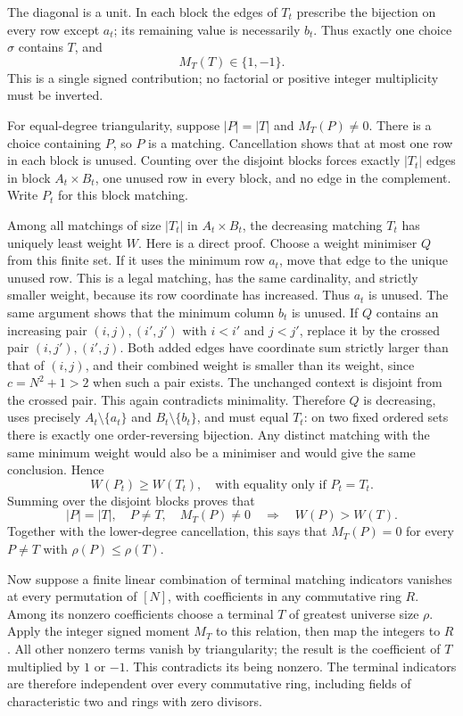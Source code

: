 The diagonal is a unit.  In each block the edges of $T_t$ prescribe the
bijection on every row except $a_t$; its remaining value is necessarily
$b_t$.  Thus exactly one choice $\sigma$ contains $T$, and
\[
 M_T(T)\in\{1,-1\}.
\]
This is a single signed contribution; no factorial or positive integer
multiplicity must be inverted.

For equal-degree triangularity, suppose $|P|=|T|$ and $M_T(P)\ne0$.
There is a choice containing $P$, so $P$ is a matching.  Cancellation
shows that at most one row in each block is unused.  Counting over the
disjoint blocks forces exactly $|T_t|$ edges in block $A_t\times B_t$,
one unused row in every block, and no edge in the complement.  Write
$P_t$ for this block matching.

Among all matchings of size $|T_t|$ in $A_t\times B_t$, the decreasing
matching $T_t$ has uniquely least weight $W$.  Here is a direct proof.
Choose a weight minimiser $Q$ from this finite set.  If it uses the
minimum row $a_t$, move that edge to the unique unused row.  This is a
legal matching, has the same cardinality, and strictly smaller weight,
because its row coordinate has increased.  Thus $a_t$ is unused.
The same argument shows that the minimum column $b_t$ is unused.
If $Q$ contains an increasing pair $(i,j),(i',j')$ with
$i<i'$ and $j<j'$, replace it by the crossed pair
$(i,j'),(i',j)$.  Both added edges have coordinate sum strictly larger
than that of $(i,j)$, and their combined weight is smaller than its
weight, since $c=N^2+1>2$ when such a pair exists.  The unchanged context
is disjoint from the crossed pair.  This again contradicts minimality.
Therefore $Q$ is decreasing, uses precisely $A_t\setminus\{a_t\}$
and $B_t\setminus\{b_t\}$, and must equal $T_t$: on two fixed ordered
sets there is exactly one order-reversing bijection.  Any distinct
matching with the same minimum weight would also be a minimiser and
would give the same conclusion.  Hence
\[
 W(P_t)\geq W(T_t),\quad\text{with equality only if }P_t=T_t.
\]
Summing over the disjoint blocks proves that
\[
 |P|=|T|,\quad P\ne T,\quad M_T(P)\ne0
 \quad\Longrightarrow\quad W(P)>W(T).
\]
Together with the lower-degree cancellation, this says that $M_T(P)=0$
for every $P\ne T$ with $\rho(P)\leq\rho(T)$.

Now suppose a finite linear combination of terminal matching indicators
vanishes at every permutation of $[N]$, with coefficients in any
commutative ring $R$.  Among its nonzero coefficients choose a terminal
$T$ of greatest universe size $\rho$.  Apply the integer signed moment $M_T$ to
this relation, then map the integers to $R$.  All other nonzero terms
vanish by triangularity; the result is the coefficient of $T$ multiplied
by $1$ or $-1$.  This contradicts its being nonzero.  The terminal
indicators are therefore independent over every commutative ring,
including fields of characteristic two and rings with zero divisors.

